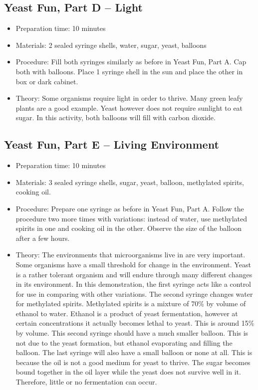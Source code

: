 \subsection{Yeast Fun, Part D -- Light}
\begin{itemize}
\item{Preparation time: 10 minutes}
\item{Materials: 2 sealed syringe shells, water, sugar, yeast, balloons}
\item{Procedure: Fill both syringes similarly as before in Yeast Fun, Part A. Cap both with balloons. Place 1 syringe shell in the sun and place the other in box or dark cabinet.}
\item{Theory: Some organisms require light in order to thrive. Many green leafy plants are a good example. Yeast however does not require sunlight to eat sugar. In this activity, both balloons will fill with carbon dioxide.}
\end{itemize}


\subsection{Yeast Fun, Part E -- Living Environment}
\begin{itemize}
\item{Preparation time: 10 minutes}
\item{Materials:  3 sealed syringe shells, sugar, yeast, balloon, methylated spirits, cooking oil.}
\item{Procedure: Prepare one syringe as before in Yeast Fun, Part A. Follow the procedure two more times with variations: instead of water, use methylated spirits in one and cooking oil in the other. Observe the size of the balloon after a few hours.}
\item{Theory: The environments that microorganisms live in are very important. Some organisms have a small threshold for change in the environment. Yeast is a rather tolerant organism and will endure through many different changes in its environment. In this demonstration, the first syringe acts like a control for use in comparing with other variations. The second syringe changes water for methylated spirits. Methylated spirits is a mixture of 70\% by volume of ethanol to water. Ethanol is a product of yeast fermentation, however at certain concentrations it actually becomes lethal to yeast. This is around 15\% by volume. This second syringe should have a much smaller balloon. This is not due to the yeast formation, but ethanol evaporating and filling the balloon. The last syringe will also have a small balloon or none at all. This is because the oil is not a good medium for yeast to thrive. The sugar becomes bound together in the oil layer while the yeast does not survive well in it. Therefore, little or no fermentation can occur.}
\end{itemize}

